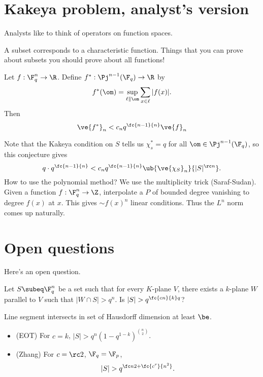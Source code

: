\section{Kakeya problem, analyst's version}
Analysts like to think of operators on function spaces.

A subset corresponds to a characteristic function. Things that you can prove about subsets you should prove about all functions!

\begin{thm}
Let $f:\F_q^n \to \R$. Define $f^*:\Pj^{n-1}(\F_q)\to \R$ by
\[
f^*(\om) = \sup_{\ell\parallel \om}\sum_{x\in \ell} |f(x)|.
\]
Then
\[
\ve{f^*}_n< c_n q^{\fc{n-1}{n}} \ve{f}_n
\]
\end{thm}
Note that the Kakeya condition on $S$ tells us $\chi_s^*=q$ for all $\om\in \Pj^{n-1}(\F_q)$, so this conjecture gives
\[
q\cdot q^{\fc{n-1}{n}} < c_n q^{\fc{n-1}{n}}\ub{\ve{\chi_S}_n}{|S|^{\rc n}}.
\]
How to use the polynomial method? We use the multiplicity trick (Saraf-Sudan). Given a function $f:\F_q^n\to \Z$, interpolate a $P$ of bounded degree vanishing to degree $f(x)$ at $x$. 
This gives $\sim f(x)^n$ linear conditions. 
Thus the $L^n$ norm comes up naturally. 


\section{Open questions}

Here's an open question.
\begin{prb}
Let $S\subeq \F_q^n$ be a set such that for every $K$-plane $V$, there exists a $k$-plane $W$ parallel to $V$ such that $|W\cap S|>q^n$. Is $|S|>q^{\fc{cn}{k}q}$?
\end{prb}

Line segment intersects in set of Hausdorff dimension at least $\be$.

\begin{thm}
\begin{itemize}
\item (EOT)
For $c=k$, $|S|>q^n(1-q^{1-k})^{\binom n2}$.
\item
(Zhang) For $c=\rc 2$, $\F_q=\F_p$, 
\[
|S|>q^{\fc n2+\fc{c^r}{n^2}}.
\]
\end{itemize}
\end{thm}

